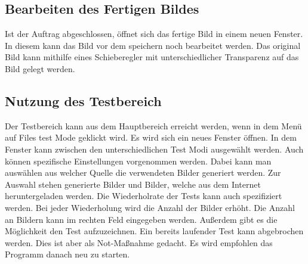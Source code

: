 \newpage
\subsection*{Bearbeiten des Fertigen Bildes}
Ist der Auftrag abgeschlossen, öffnet sich das fertige Bild in einem neuen Fenster. In diesem kann das Bild vor dem speichern noch bearbeitet werden. Das original Bild kann mithilfe eines Schieberegler mit unterschiedlicher Transparenz auf das Bild gelegt werden.
\begin{figure}[h]
    \centering
    \label{fertig}
\end{figure}

\subsection*{Nutzung des Testbereich}
Der Testbereich kann aus dem Hauptbereich erreicht werden, wenn in dem Menü auf Files \textrightarrow test Mode geklickt wird. Es wird sich ein neues Fenster öffnen. In dem Fenster kann zwischen den unterschiedlichen Test Modi ausgewählt werden. Auch können spezifische Einstellungen vorgenommen werden. Dabei kann man auswählen aus welcher Quelle die verwendeten Bilder generiert werden. Zur Auswahl stehen generierte Bilder und Bilder, welche aus dem Internet heruntergeladen werden. Die Wiederholrate der Tests kann auch spezifiziert werden. Bei jeder Wiederholung wird die Anzahl der Bilder erhöht. Die Anzahl an Bildern kann im rechten Feld eingegeben werden. Außerdem gibt es die Möglichkeit den Test aufzuzeichnen. Ein bereits laufender Test kann abgebrochen werden. Dies ist aber als Not-Maßnahme gedacht. Es wird empfohlen das Programm danach neu zu starten.

